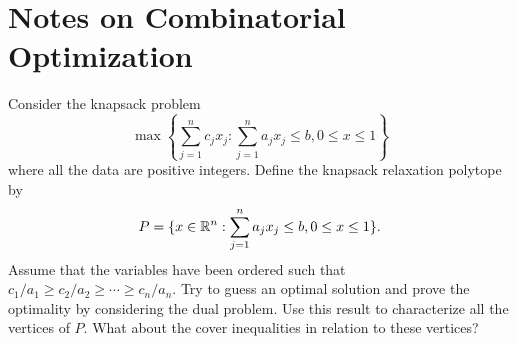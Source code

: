 \section{Notes on Combinatorial Optimization}

\begin{exercise}
  Consider the knapsack problem
  \begin{equation}
    \max \left\{
      \sum_{j = 1}^{n} c_j x_j :
      \sum_{j = 1}^{n} a_j x_j \leq b,
      0 \leq x \leq 1
    \right\}
  \end{equation}
  where all the data are positive integers.
  Define the knapsack relaxation polytope by
  \begin{equation}
    P = \{
      x \in \mathbb{R}^n :
      \sum_{j = 1}^{n} a_j x_j \leq b,
      0 \leq x \leq 1
    \}.
  \end{equation}
  Assume that the variables have been ordered such that $c_1 / a_1 \geq c_2 / a_2 \geq \cdots \geq c_n / a_n$.
  Try to guess an optimal solution and prove the optimality by considering the dual problem.
  Use this result to characterize all the vertices of $P$.
  What about the cover inequalities in relation to these vertices?
\end{exercise}


